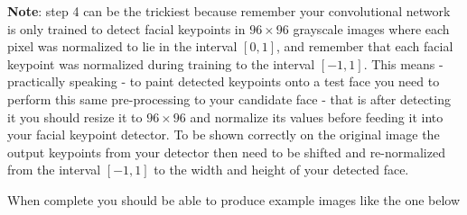 \documentclass[11pt]{article}
\begin{document}
\textbf{Note}: step 4 can be the trickiest because remember your
convolutional network is only trained to detect facial keypoints in
\(96 \times 96\) grayscale images where each pixel was normalized to lie
in the interval \([0,1]\), and remember that each facial keypoint was
normalized during training to the interval \([-1,1]\). This means -
practically speaking - to paint detected keypoints onto a test face you
need to perform this same pre-processing to your candidate face - that
is after detecting it you should resize it to \(96 \times 96\) and
normalize its values before feeding it into your facial keypoint
detector. To be shown correctly on the original image the output
keypoints from your detector then need to be shifted and re-normalized
from the interval \([-1,1]\) to the width and height of your detected
face.

When complete you should be able to produce example images like the one
below
\end{document}
